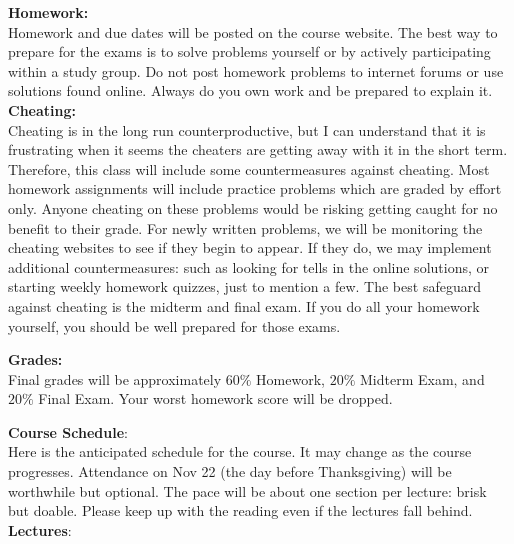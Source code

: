 \documentclass[12pt]{article}
\begin{document}
\newpage
\noindent

\noindent
\textbf{Homework:}\\
Homework and due dates will be posted on the course website.  The best way to prepare for the exams is to solve problems yourself or by actively participating within a study group.  Do not post homework problems to internet forums or use solutions found online.  Always do you own work and be prepared to explain it.\\

\noindent
\textbf{Cheating:}\\
Cheating is in the long run counterproductive, but I can understand that it is frustrating when it seems the cheaters are getting away with it in the short term.  Therefore, this class will include some countermeasures against cheating.  Most homework assignments will include practice problems which are graded by effort only.  Anyone cheating on these problems would be risking getting caught for no benefit to their grade.  For newly written problems, we will be monitoring the cheating websites to see if they begin to appear.  If they do, we may implement additional countermeasures: such as looking for tells in the online solutions, or starting weekly homework quizzes, just to mention a few.
The best safeguard against cheating is the midterm and final exam.  If you do all your homework yourself, you should be well prepared for those exams.

\noindent
\textbf {Grades:}\\
Final grades will be approximately $60\%$ Homework, $20\%$ Midterm Exam, and
$20\%$ Final Exam.  Your worst homework score will be dropped.\\
\noindent

\noindent
\textbf {Course Schedule}:\\
Here is the anticipated schedule for the course.  It may change as the
course progresses.  Attendance on Nov 22 (the day before Thanksgiving) will be worthwhile but optional.
The pace will be about one section per lecture: brisk but doable.  Please keep up with the reading even if the lectures fall behind.\\

\noindent
\textbf {Lectures}:\\
\end{document}
